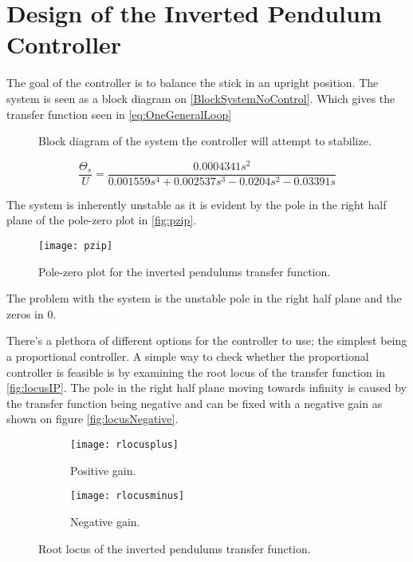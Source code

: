 \graphicspath{{figures/Design/IPController/}}
\chapter{Design of the Inverted Pendulum Controller}\label{sec:IPController}

The goal of the controller is to balance the stick in an upright position. The system is seen as a block diagram on \autoref{BlockSystemNoControl}. Which gives the transfer function seen in \autoref{eq:OneGeneralLoop}
\begin{figure}[htbp]
\centering
\missingfigure{}
\caption{Block diagram of the system the controller will attempt to stabilize.}
\label{fig:BlockSystemNoControl}
\end{figure}

\begin{equation}\label{eq:OneGeneralLoop}
	\frac{\Theta_s}{U}=\frac{0.0004341 s^2}{0.001559 s^4 + 0.002537 s^3 - 0.0204 s^2 - 0.03391 s}
\end{equation}

The system is inherently unstable as it is evident by the pole in the right half plane of the pole-zero plot in \autoref{fig:pzip}.

\begin{figure}[htbp]
\centering
\texttt{[image: pzip]}
\caption{Pole-zero plot for the inverted pendulums transfer function.}
\label{fig:pzip}
\end{figure}

The problem with the system is the unstable pole in the right half plane and the zeros in 0.

There's a plethora of different options for the controller to use; the simplest being a proportional controller. A simple way to check whether the proportional controller is feasible is by examining the root locus of the transfer function in \autoref{fig:locusIP}. The pole in the right half plane moving towards infinity is caused by the transfer function being negative and can be fixed with a negative gain as shown on figure \autoref{fig:locusNegative}.

\begin{figure}[htbp]
\centering
	\begin{subfigure}{0.45\textwidth}
	\texttt{[image: rlocusplus]}
	\caption{Positive gain.}
	\label{fig:locusIP}
	\end{subfigure}
	\begin{subfigure}{0.45\textwidth}
	\centering
	\texttt{[image: rlocusminus]}
	\caption{Negative gain.}
	\label{fig:locusNegative}
	\end{subfigure}
\caption{Root locus of the inverted pendulums transfer function.}
\end{figure}

